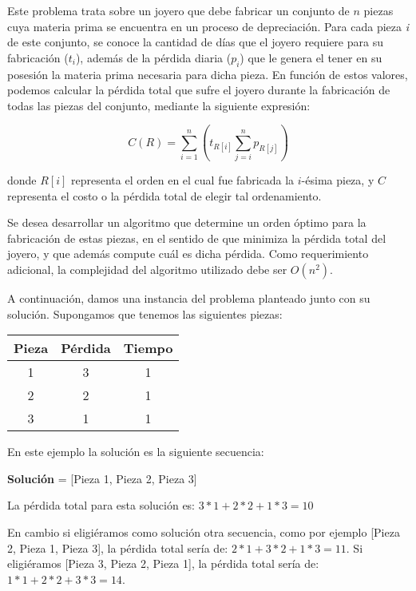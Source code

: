 Este problema trata sobre un joyero que debe fabricar un conjunto de $n$ piezas cuya materia prima se encuentra en un proceso de depreciación. Para cada pieza \emph{i} de este conjunto, se conoce la cantidad de días que el joyero requiere para su fabricación (\emph{$t_i$}), además de la pérdida diaria (\emph{$p_i$}) que le genera el tener en su posesión la materia prima necesaria para dicha pieza. En función de estos valores, podemos calcular la pérdida total que sufre el joyero durante la fabricación de todas las piezas del conjunto, mediante la siguiente expresión:

$$C(R) = \sum_{i=1}^{n} (t_{R[i]} \sum_{j=i}^{n}p_{R[j]})$$

donde $R[i]$ representa el orden en el cual fue fabricada la $i$-ésima pieza, y $C$ representa el costo o la pérdida total de elegir tal ordenamiento.

Se desea desarrollar un algoritmo que determine un orden óptimo para la fabricación de estas piezas, en el sentido de que minimiza la pérdida total del joyero, y que además compute cuál es dicha pérdida. Como requerimiento adicional, la complejidad del algoritmo utilizado debe ser $O(n^2)$.

A continuación, damos una instancia del problema planteado junto con su solución. Supongamos que tenemos las siguientes piezas:

\begin{center}
  \begin{tabular}{|c|c|c|}
   \hline
   \textbf{Pieza} & \textbf{Pérdida} & \textbf{Tiempo} \\
   \hline
   1 & 3 & 1 \\
   
   2 & 2 & 1 \\
   
   3 & 1 & 1 \\
   \hline
  \end{tabular}
\end{center}

En este ejemplo la solución es la siguiente secuencia:

\textbf{Solución} = [Pieza 1, Pieza 2, Pieza 3]

La pérdida total para esta solución es: $3*1 + 2*2 + 1*3 = 10$

En cambio si eligiéramos como solución otra secuencia, como por ejemplo [Pieza 2, Pieza 1, Pieza 3], la pérdida total sería de: $2*1 + 3*2 + 1*3 = 11$. Si eligiéramos [Pieza 3, Pieza 2, Pieza 1], la pérdida total sería de: $1*1 + 2*2 + 3*3 = 14$.